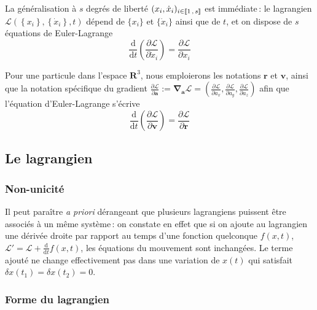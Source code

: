     La généralisation à $s$ degrés de liberté $(x_i, \dot{x}_i)_{i \in \left[\!\left[ 1 \, , \, s \right]\!\right]}$ est immédiate : le lagrangien $\mathcal{L}(\left\{x_i\right\}, \left\{\dot{x}_i\right\},t)$ dépend de $\{x_i\}$ et $\{\dot{x}_i\}$ ainsi que de $t$, et on dispose de $s$ équations de Euler-Lagrange 
    \[ \frac{\text{d}}{\text{d}t} \left(\frac{\partial \mathcal{L}}{\partial \dot{x}_i} \right) = \frac{\partial \mathcal{L}}{\partial x_i} \] 

    Pour une particule dans l’espace $\mathbf{R}^3$, nous emploierons les notations $\mathbf{r}$ et $\mathbf{v}$, ainsi que la notation spécifique du gradient $\frac{\partial \mathcal{L}}{\partial \mathbf{a}} := \symbf{\nabla}_{\mathbf{a}} \mathcal{L} = \left(\frac{\partial \mathcal{L}}{\partial a_x}, \frac{\partial \mathcal{L}}{\partial a_y}, \frac{\partial \mathcal{L}}{\partial a_z}\right)$ afin que l’équation d’Euler-Lagrange s’écrive 
    \[ \frac{\text{d}}{\text{d}t} \left(\frac{\partial \mathcal{L}}{\partial \mathbf{v}} \right) = \frac{\partial \mathcal{L}}{\partial \mathbf{r}}  \]

    \subsection{Le lagrangien}

        \subsubsection{Non-unicité}

        Il peut paraître \textit{a priori} dérangeant que plusieurs lagrangiens puissent être associés à un même système : on constate en effet que si on ajoute au lagrangien une dérivée droite par rapport au temps d’une fonction quelconque $f(x,t)$, $\mathcal{L}' = \mathcal{L} + \frac{\text{d}}{\text{d}t} f(x,t)$, les équations du mouvement sont inchangées. Le terme ajouté ne change effectivement pas dans une variation de $x(t)$ qui satisfait $\delta x(t_1) = \delta x(t_2) = 0$.

        \subsubsection{Forme du lagrangien}

